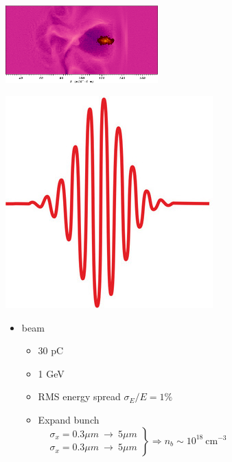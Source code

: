 \documentclass[8pt]{beamer}
\begin{document}
\begin{frame}[t]
\begin{flushright}\includegraphics[height=3cm]{frame1}\end{flushright}

\vspace{-174pt}\hspace{125pt}\includegraphics[scale=0.13]{laserpulse}\linebreak
\vfill \begin{flushright}
\begin{minipage}{0.51\textwidth}
\begin{itemize}
\item {} beam
\begin{itemize}
\item 30 pC
\item 1 GeV
\item RMS energy spread $\sigma_E/E=1\%$
\item Expand bunch \\
$\left.\begin{aligned}
&\sigma_{x}=0.3 \mu m ~\to~5\mu m\\
&\sigma_{x}=0.3 \mu m ~\to~5\mu m
\end{aligned}\right\} \Rightarrow n_b\sim10^{18}~\text{cm}^{-3}$ 
\end{itemize}
\end{itemize}
\end{minipage}
\end{flushright}


\end{frame}
\end{document}
